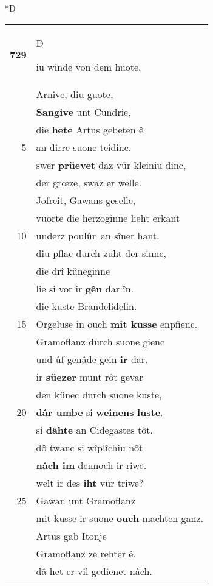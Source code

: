\documentclass[8pt,a4paper,notitlepage]{article}
\begin{document}
\begin{table}[ht]
\begin{minipage}[t]{0.5\linewidth}
\small
\begin{center}*D
\end{center}
\begin{tabular}{rl}
\textbf{729} & \begin{large}D\end{large}iu winde von dem huote.\\ 
 & Arnive, diu guote,\\ 
 & \textbf{Sangive} unt Cundrie,\\ 
 & die \textbf{hete} Artus gebeten ê\\ 
5 & an dirre suone teidinc.\\ 
 & swer \textbf{prüevet} daz vür kleiniu dinc,\\ 
 & der grœze, swaz er welle.\\ 
 & Jofreit, Gawans geselle,\\ 
 & vuorte die herzoginne lieht erkant\\ 
10 & underz poulûn an sîner hant.\\ 
 & diu pflac durch zuht der sinne,\\ 
 & die drî küneginne\\ 
 & lie si vor ir \textbf{gên} dar în.\\ 
 & die kuste Brandelidelin.\\ 
15 & Orgeluse in ouch \textbf{mit kusse} enpfienc.\\ 
 & Gramoflanz durch suone gienc\\ 
 & und ûf genâde gein \textbf{ir} dar.\\ 
 & ir \textbf{süezer} munt rôt gevar\\ 
 & den künec durch suone kuste,\\ 
20 & \textbf{dâr umbe} si \textbf{weinens} \textbf{luste}.\\ 
 & si \textbf{dâhte} an Cidegastes tôt.\\ 
 & dô twanc si wîplîchiu nôt\\ 
 & \textbf{nâch im} dennoch ir riwe.\\ 
 & welt ir des \textbf{iht} vür triwe?\\ 
25 & Gawan unt Gramoflanz\\ 
 & mit kusse ir suone \textbf{ouch} machten ganz.\\ 
 & Artus gab Itonje\\ 
 & Gramoflanz ze rehter ê.\\ 
 & dâ het er vil gedienet nâch.\\ 

\end{tabular}
\end{minipage}
\end{table}
\end{document}
